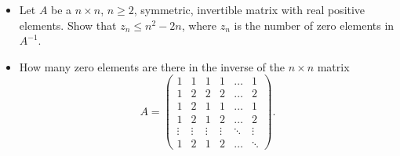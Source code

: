 \begin{itemize}
    \item[(a)] Let \(A\) be a \(n\times n\), \(n\geq 2\), symmetric, invertible matrix with real positive elements. Show that \(z_n\leq n^2-2n\), where \(z_n\) is the number of zero elements in \(A^{-1}\).

    \item[(b)] How many zero elements are there in the inverse of the \(n\times n\) matrix
    \[ A = \begin{pmatrix}
        1&1&1&1&\ldots&1\\
        1&2&2&2&\ldots&2\\
        1&2&1&1&\ldots&1\\
        1&2&1&2&\ldots&2\\
        \vdots&\vdots&\vdots&\vdots&\ddots&\vdots\\
        1&2&1&2&\ldots&\ddots
    \end{pmatrix}. \]
\end{itemize}